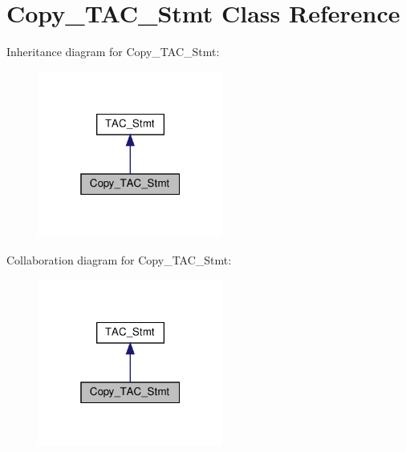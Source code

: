 \hypertarget{classCopy__TAC__Stmt}{}\section{Copy\+\_\+\+T\+A\+C\+\_\+\+Stmt Class Reference}
\label{classCopy__TAC__Stmt}


Inheritance diagram for Copy\+\_\+\+T\+A\+C\+\_\+\+Stmt\+:
\nopagebreak
\begin{figure}[H]
\begin{center}
\leavevmode
\includegraphics[width=172pt]{classCopy__TAC__Stmt__inherit__graph}
\end{center}
\end{figure}


Collaboration diagram for Copy\+\_\+\+T\+A\+C\+\_\+\+Stmt\+:
\nopagebreak
\begin{figure}[H]
\begin{center}
\leavevmode
\includegraphics[width=172pt]{classCopy__TAC__Stmt__coll__graph}
\end{center}
\end{figure}
